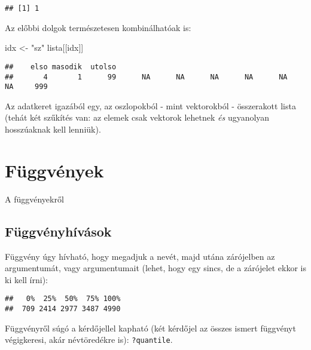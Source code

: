 \documentclass[
]{book}
\newenvironment{Shaded}{\begin{snugshade}}{\end{snugshade}}
\newcommand{\KeywordTok}[1]{\textcolor[rgb]{0.13,0.29,0.53}{\textbf{#1}}}
\newcommand{\NormalTok}[1]{#1}
\newcommand{\OperatorTok}[1]{\textcolor[rgb]{0.81,0.36,0.00}{\textbf{#1}}}
\newcommand{\StringTok}[1]{\textcolor[rgb]{0.31,0.60,0.02}{#1}}
\begin{document}
\begin{verbatim}
## [1] 1
\end{verbatim}

Az előbbi dolgok természetesen kombinálhatóak is:

\begin{Shaded}
\begin{Highlighting}[]
\NormalTok{idx <-}\StringTok{ "sz"}
\NormalTok{lista[[idx]]}
\end{Highlighting}
\end{Shaded}

\begin{verbatim}
##    elso masodik  utolso                                                         
##       4       1      99      NA      NA      NA      NA      NA      NA     999
\end{verbatim}

Az adatkeret igazából egy, az oszlopokból - mint vektorokból - összerakott lista (tehát két szűkítés van: az elemek csak vektorok lehetnek \emph{és} ugyanolyan hosszúaknak kell lenniük).

\hypertarget{fuxfcggvuxe9nyek}{%
\chapter{Függvények}\label{fuxfcggvuxe9nyek}}

A függvényekről

\hypertarget{fuxfcggvuxe9nyhuxedvuxe1sok}{%
\section{Függvényhívások}\label{fuxfcggvuxe9nyhuxedvuxe1sok}}

Függvény úgy hívható, hogy megadjuk a nevét, majd utána zárójelben az argumentumát, vagy argumentumait (lehet, hogy egy sincs, de a zárójelet ekkor is ki kell írni):

\begin{Shaded}
\end{Shaded}

\begin{verbatim}
##   0%  25%  50%  75% 100% 
##  709 2414 2977 3487 4990
\end{verbatim}

Függvényről súgó a kérdőjellel kapható (két kérdőjel az összes ismert függvényt végigkeresi, akár névtöredékre is): \texttt{?quantile}.
\end{document}
